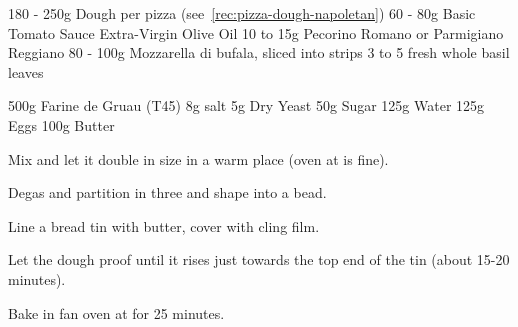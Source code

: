 \begin{ingreds}
	180 - 250g Dough per pizza (see~\ref{rec:pizza-dough-napoletan})
	60 - 80g Basic Tomato Sauce
	Extra-Virgin Olive Oil 
	10 to 15g Pecorino Romano or Parmigiano Reggiano
	80 - 100g Mozzarella di bufala, sliced into strips
	3 to 5 fresh whole basil leaves
\end{ingreds}


\label{rec:bread-brioche}

\begin{ingreds}
	500g Farine de Gruau (T45)
	8g salt
	5g Dry Yeast
	50g Sugar
	125g Water
	125g Eggs
	100g Butter
\end{ingreds}

\begin{method}[]
	Mix and let it double in size in a warm place (oven at  is fine).

	Degas and partition in three and shape into a bead.

	Line a bread tin with butter, cover with cling film.
	
	Let the dough proof until it rises just towards the top end of the tin (about 15-20 minutes).

	Bake in fan oven at  for 25 minutes.

\end{method}

